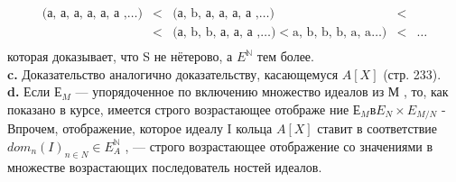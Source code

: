 			$$\begin{array}{ccccc}
						\text{(а, а, а, а, а, а ,}\ldots) & < & \text{(а, b, а, а, а, а ,}\ldots) & < & \\
																				 & < & \text{(а, b, b, а, а, а ,}\ldots) < \text{a, b, b, b, a, a}\ldots) & < & \ldots \\
			\end{array}$$
которая доказывает, что S не нётерово, а $E^{\mathbb{N}}$ тем более.\\
\hspace*{15pt}\textbf{c.} Доказательство аналогично доказательству, касающемуся $A[X]$\linebreak
(стр. 233).\\
\hspace*{15pt}\textbf{d.} Если $Е_M$ — упорядоченное по включению множество идеалов из\linebreak
М , то, как показано в курсе, имеется строго возрастающее отображе­\linebreak
ние $Е_M в E_N \times E_{M/N}$ - Впрочем, отображение, которое идеалу I кольца\linebreak
$A[X]$ ставит в соответствие $dom_n(I)_{n \in N} \in E^{\mathbb{N}}_A$ , — строго возрастающее\linebreak
отображение со значениями в множестве возрастающих последователь­\linebreak
ностей идеалов.

